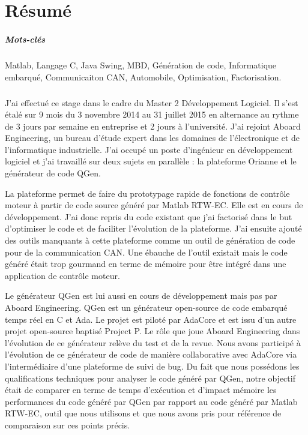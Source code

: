 \chapter*{Résumé}

\paragraph*{Mots-clés}
Matlab, Langage C, Java Swing, MBD, Génération de code, Informatique embarqué, Communicaiton
CAN, Automobile, Optimisation, Factorisation.

\paragraph*{}
J'ai effectué ce stage dans le cadre du Master 2 Développement Logiciel. Il
s'est étalé sur 9 mois du 3 novembre 2014 au 31 juillet 2015 en alternance au
rythme de 3 jours par semaine en entreprise et 2 jours à l'université. J'ai
rejoint Aboard Engineering, un bureau d'étude expert dans les domaines de
l'électronique et de l'informatique industrielle. J'ai occupé un poste
d'ingénieur en développement logiciel et j'ai travaillé sur deux sujets en
parallèle : la plateforme Orianne et le générateur de code QGen.

La plateforme permet de faire du prototypage rapide de fonctions de contrôle
moteur à partir de code source généré par Matlab\up{\circledR}
RTW-EC\up{\circledR}. Elle est en cours de développement. J'ai donc repris du
code existant que j'ai factorisé dans le but d'optimiser le code et de faciliter
l'évolution de la plateforme.
J'ai ensuite ajouté des outils manquants à cette plateforme comme un outil de
génération de code pour de la communication CAN. Une ébauche de l'outil existait
mais le code généré était trop gourmand en terme de mémoire pour être intégré
dans une application de contrôle moteur.

Le générateur QGen est lui aussi en cours de développement mais pas par Aboard
Engineering. QGen est un générateur open-source de code embarqué temps réel en C
et Ada. Le projet est piloté par AdaCore et est issu d'un autre projet
open-source baptisé Project P. Le rôle que joue Aboard Engineering dans
l'évolution de ce générateur relève du test et de la revue. Nous avons
participé à l'évolution de ce générateur de code de manière collaborative avec
AdaCore via l'intermédiaire d'une plateforme de suivi de bug. Du fait que nous
possédons les qualifications techniques pour analyser le code généré par QGen,
notre objectif était de comparer en terme de temps d'exécution et d'impact
mémoire les performances du code généré par QGen par rapport au code généré par
Matlab\up{\circledR} RTW-EC\up{\circledR}, outil que nous utilisons et que nous
avons pris pour référence de comparaison sur ces points précis.

